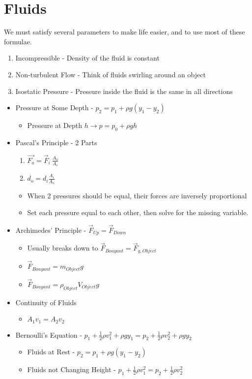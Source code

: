 \section{Fluids}\label{sec:Fluids}
We must satisfy several parameters to make life easier, and to use most of these formulae.
\begin{enumerate}[noitemsep]
\item Incompressible - Density of the fluid is constant
\item Non-turbulent Flow - Think of fluids swirling around an object
\item Isostatic Pressure - Pressure inside the fluid is the same in all directions
\end{enumerate}

\begin{itemize}[noitemsep]
\item Pressure at Some Depth - $p_{2} = p_{1} + \rho g \left( y_{1}-y_{2} \right)$
  \begin{itemize}
  \item Pressure at Depth $h \rightarrow p = p_{0} + \rho gh$
  \end{itemize}
\item Pascal's Principle - 2 Parts
  \begin{enumerate}[noitemsep]
  \item $\vec{F_{o}} = \vec{F}_{i}\ \frac{A_{o}}{A_{i}}$
  \item $d_{o} = d_{i} \frac{A_{i}}{A_{o}}$
  \end{enumerate}
  \begin{itemize}[noitemsep, nolistsep]
  \item When 2 pressures should be equal, their forces are inversely proportional
  \item Set each pressure equal to each other, then solve for the missing variable.
  \end{itemize}
\item Archimedes' Principle - $\vec{F}_{Up} = \vec{F}_{Down}$
  \begin{itemize}[noitemsep]
  \item Usually breaks down to $\vec{F}_{Bouyant} = \vec{F}_{g, Object}$
  \item $\vec{F}_{Bouyant} = m_{Object}g$
  \item $\vec{F}_{Bouyant} = \rho_{Object}V_{Object}g$
  \end{itemize}
\item Continuity of Fluids
  \begin{itemize}[noitemsep]
  \item $A_{1}v_{1} = A_{2}v_{2}$
  \end{itemize}
\item Bernoulli's Equation - $p_{1} + \frac{1}{2} \rho v_{1}^{2} + \rho gy_{1} = p_{2} + \frac{1}{2} \rho v_{2}^{2} + \rho gy_{2}$
  \begin{itemize}[noitemsep]
  \item Fluids at Rest - $p_{2} = p_{1} + \rho g \left( y_{1}-y_{2} \right)$
  \item Fluids not Changing Height - $p_{1} + \frac{1}{2} \rho v_{1}^{2} = p_{2} + \frac{1}{2} \rho v_{2}^{2}$
  \end{itemize}
\end{itemize}